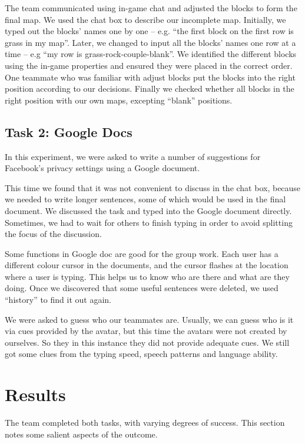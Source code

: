 \documentclass{acm_proc_article-sp}
\begin{document}
The team communicated using in-game chat and adjusted the blocks to form the final map. We used the chat box to describe our incomplete map. Initially, we typed out the blocks' names one by one -- e.g. ``the first block on the first row is grass in my map''. Later, we changed to input all the blocks' names one row at a time -- e.g ``my row is grass-rock-couple-blank''. We identified the different blocks using the in-game properties and ensured they were placed in the correct order. One teammate who was familiar with adjust blocks put the blocks into the right position according to our decisions. Finally we checked whether all blocks in the right position with our own maps, excepting ``blank'' positions.

\subsection{Task 2: Google Docs}

In this experiment, we were asked to write a number of suggestions for Facebook's privacy settings using a Google document.
 
This time we found that it was not convenient to discuss in the chat box, because we needed to write longer sentences, some of which would be used in the final document. We discussed the task and typed into the Google document directly. Sometimes, we had to wait for others to finish typing in order to avoid splitting the focus of the discussion.
 
Some functions in Google doc are good for the group work. Each user has a different colour cursor in the documents, and the cursor flashes at the location where a user is typing. This helps us to know who are there and what are they doing. Once we discovered that some useful sentences were deleted, we used ``history'' to find it out again.

We were asked to guess who our teammates are. Usually, we can guess who is it via cues provided by the avatar, but this time the avatars were not created by ourselves. So they in this instance they did not provide adequate cues. We still got some clues from the typing speed, speech patterns and language ability.



\section{Results}
The team completed both tasks, with varying degrees of success. This section notes some salient aspects of the outcome.
\end{document}

